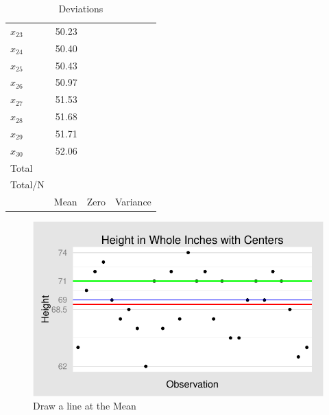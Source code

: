 \documentclass[nohyper,justified]{tufte-handout}\usepackage[]{graphicx}\usepackage[]{color}
\makeatletter
\def\maxwidth{ %
  \ifdim\Gin@nat@width>\linewidth
    \linewidth
  \else
    \Gin@nat@width
  \fi
}
\newenvironment{knitrout}{}{} %
\makeatother
\begin{document}
\begin{table}[ht]
\begin{tabular}{lrll}
  $x_{23}$ & 50.23 &              &               \\ 
   \rowcolor[gray]{0.95}$x_{24}$ & 50.40 &              &               \\ 
  $x_{25}$ & 50.43 &              &               \\ 
   \rowcolor[gray]{0.95}$x_{26}$ & 50.97 &              &               \\ 
  $x_{27}$ & 51.53 &              &               \\ 
   \rowcolor[gray]{0.95}$x_{28}$ & 51.68 &              &               \\ 
  $x_{29}$ & 51.71 &              &               \\ 
   \rowcolor[gray]{0.95}$x_{30}$ & 52.06 &              &               \\ 
   \bottomrule
Total & & & \\ 
\rowcolor[gray]{0.95}Total/N & & & \\ 
 & Mean & Zero & Variance \\
\end{tabular}
\caption{Deviations} 
\end{table}



\begin{figure}
\begin{knitrout}
\color{fgcolor}

{\centering \includegraphics[width=\maxwidth]{figure/graphics-center-chart-1} 

}



\end{knitrout}
\caption{Draw a line at the Mean}
\end{figure}
\end{document}
